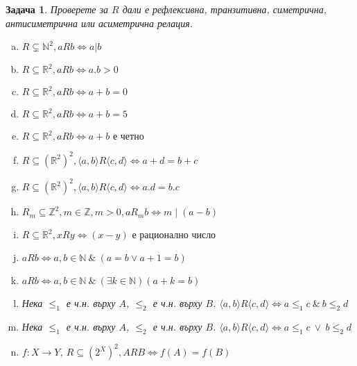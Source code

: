 \documentclass[a4paper]{article}
\newtheorem{problem}{Задача}
\newcommand{\R}{\mathbb{R}}
\newcommand{\Z}{\mathbb{Z}}
\newcommand{\N}{\mathbb{N}}
\begin{document}
\begin{problem}
  Проверете за $R$ дали е рефлексивна, транзитивна, симетрична, антисиметрична или асиметрична релация.
  \begin{enumerate}[a)]
  \item
    $R\subsetneq \mathbb{N}^2, aRb \iff a | b$ 
  \item
    $R\subseteq \R^2 , aRb \iff a.b > 0$ 
  \item
    $R\subseteq \R^2, aRb \iff a+b = 0$
  \item
    $R\subseteq \R^2, aRb \iff a+b = 5$ 
  \item
    $R\subseteq \R^2, aRb \iff a+b\mbox{ е четно }$ 
  \item
    $R\subseteq (\R^2)^2, \langle{a,b}\rangle R \langle{c,d}\rangle \iff a+d = b+c$ 
  \item
    $R\subseteq (\R^2)^2, \langle{a,b}\rangle R \langle{c,d}\rangle \iff a.d = b.c$ 
  \item
    $R_{m}\subseteq \Z^2, m\in \Z, m>0, aR_{m}b \iff m\mid (a - b)$ 
  \item
    $R\subseteq \R^2, xRy \iff (x-y)\mbox{ е рационално число}$ 
  \item
    $aRb \iff a,b\in\N\ \&\ (a = b \vee a+1 = b)$ 
  \item
    $aRb \iff a,b\in\N\ \&\ (\exists k\in\N)(a+k = b)$
  \item
    Нека $\leq_1$ е ч.н. върху $A$, $\leq_2$ е ч.н. върху $B$.
    $\langle{a,b}\rangle R\langle{c,d}\rangle \iff a\leq_{1}c\ \&\ b\leq_{2}d$ 
  \item
    Нека $\leq_1$ е ч.н. върху $A$, $\leq_2$ е ч.н. върху $B$.
    $\langle{a,b}\rangle R\langle{c,d}\rangle \iff a\leq_{1}c\ \vee\ b\leq_{2}d$
  \item
    $f:X\rightarrow Y$, $R\subseteq (2^{X})^{2}, ARB \iff f(A) = f(B)$ 
  \end{enumerate}
\end{problem}
\end{document}
